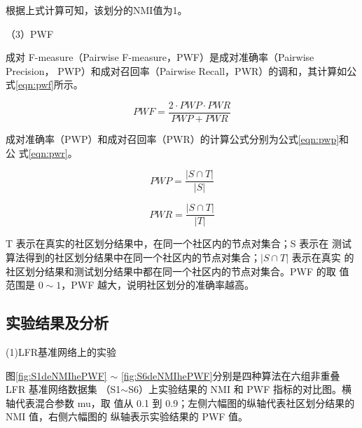 根据上式计算可知，该划分的NMI值为1。

（3）PWF

成对 F-measure（Pairwise F-measure，PWF）是成对准确率（Pairwise Precision，
PWP）和成对召回率（Pairwise Recall，PWR）的调和，其计算如公式\ref{eqn:pwf}所示。

\begin{equation}
  \label{eqn:pwf}
  PWF=\frac{2\cdot PWP\cdot PWR}{PWP+PWR}
\end{equation}

成对准确率（PWP）和成对召回率（PWR）的计算公式分别为公式\ref{eqn:pwp}和公
式\ref{eqn:pwr}。

\begin{equation}
  \label{eqn:pwp}
  PWP=\frac{ \left | S \cap T \right |}{ \left | S \right |}
\end{equation}

\begin{equation}
  \label{eqn:pwr}
  PWR=\frac{ \left | S \cap T \right |}{ \left | T \right |}
\end{equation}

T 表示在真实的社区划分结果中，在同一个社区内的节点对集合；S 表示在
测试算法得到的社区划分结果中在同一个社区内的节点对集合；$\left | S \cap T \right |$ 表示在真实
的社区划分结果和测试划分结果中都在同一个社区内的节点对集合。PWF 的取
值范围是 $0 \sim 1$，PWF 越大，说明社区划分的准确率越高。

\subsection{实验结果及分析}

(1)LFR基准网络上的实验

图\ref{fig:S1deNMIhePWF} $\sim$ \ref{fig:S6deNMIhePWF}分别是四种算法在六组非重叠 LFR 基准网络数据集
（S1$\sim$S6）上实验结果的 NMI 和 PWF 指标的对比图。横轴代表混合参数 mu，取
值从 0.1 到 0.9；左侧六幅图的纵轴代表社区划分结果的 NMI 值，右侧六幅图的
纵轴表示实验结果的 PWF 值。

